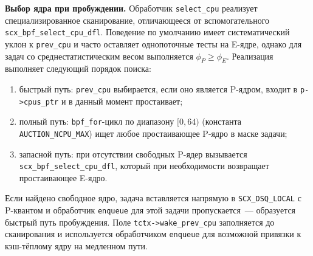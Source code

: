 \documentclass[14pt, oneside]{extbook}
\begin{document}
        \textbf{Выбор ядра при пробуждении.}
        Обработчик \texttt{select\_cpu} реализует
        специализированное сканирование, отличающееся от
        вспомогательного \texttt{scx\_bpf\_select\_\allowbreak cpu\_dfl}.
        Поведение по умолчанию имеет систематический уклон к
        \texttt{prev\_cpu} и часто оставляет однопоточные тесты
        на E-ядре, однако для задач со
        среднестатистическим весом выполняется $\phi_P \geq
        \phi_E$. Реализация выполняет следующий порядок поиска:
        \begin{enumerate}
                \item быстрый путь:
                        \texttt{prev\_cpu} выбирается, если оно
                        является P-ядром, входит в
                        \texttt{p->cpus\_ptr} и в данный момент
                        простаивает;
                \item полный путь:
                        \texttt{bpf\_for}-цикл по диапазону
                        $[0, 64)$ (константа
                        \texttt{AUCTION\_\allowbreak NCPU\_MAX})
                        ищет любое простаивающее P-ядро
                        в маске задачи;
                \item запасной путь: при отсутствии свободных
                        P-ядер вызывается
                        \texttt{scx\_bpf\_select\_\allowbreak cpu\_dfl},
                        который при необходимости возвращает
                        простаивающее E-ядро.
        \end{enumerate}
        \begin{sloppypar}
        Если найдено свободное ядро, задача вставляется
        напрямую в \texttt{SCX\_\allowbreak DSQ\_\allowbreak LOCAL} с P-квантом и
        обработчик \texttt{enqueue} для этой задачи
        пропускается~--- образуется быстрый путь пробуждения.
        Поле \texttt{tctx->\allowbreak wake\_\allowbreak prev\_\allowbreak cpu} заполняется до
        сканирования и используется обработчиком
        \texttt{enqueue} для возможной привязки к кэш-тёплому
        ядру на медленном пути.
        \end{sloppypar}
\end{document}
